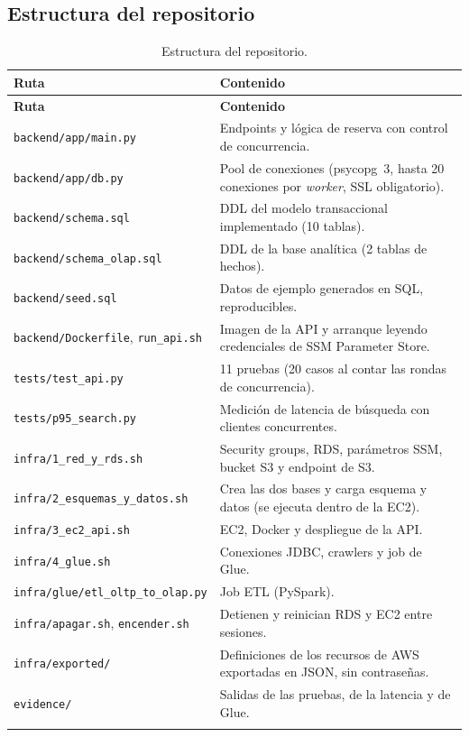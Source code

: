 \subsection{Estructura del repositorio}
\begin{longtable}{@{}L{5.0cm} L{10.6cm}@{}}
\toprule \textbf{Ruta} & \textbf{Contenido} \\ \midrule \endfirsthead
\toprule \textbf{Ruta} & \textbf{Contenido} \\ \midrule \endhead
\texttt{backend/app/main.py} & Endpoints y lógica de reserva con control de concurrencia. \\
\texttt{backend/app/db.py} & Pool de conexiones (psycopg~3, hasta 20 conexiones por \emph{worker}, SSL obligatorio). \\
\texttt{backend/schema.sql} & DDL del modelo transaccional implementado (10 tablas). \\
\texttt{backend/schema\_olap.sql} & DDL de la base analítica (2 tablas de hechos). \\
\texttt{backend/seed.sql} & Datos de ejemplo generados en SQL, reproducibles. \\
\texttt{backend/Dockerfile}, \texttt{run\_api.sh} & Imagen de la API y arranque leyendo credenciales de SSM Parameter Store. \\
\texttt{tests/test\_api.py} & 11 pruebas (20 casos al contar las rondas de concurrencia). \\
\texttt{tests/p95\_search.py} & Medición de latencia de búsqueda con clientes concurrentes. \\
\texttt{infra/1\_red\_y\_rds.sh} & Security groups, RDS, parámetros SSM, bucket S3 y endpoint de S3. \\
\texttt{infra/2\_esquemas\_y\_datos.sh} & Crea las dos bases y carga esquema y datos (se ejecuta dentro de la EC2). \\
\texttt{infra/3\_ec2\_api.sh} & EC2, Docker y despliegue de la API. \\
\texttt{infra/4\_glue.sh} & Conexiones JDBC, crawlers y job de Glue. \\
\texttt{infra/glue/etl\_oltp\_to\_olap.py} & Job ETL (PySpark). \\
\texttt{infra/apagar.sh}, \texttt{encender.sh} & Detienen y reinician RDS y EC2 entre sesiones. \\
\texttt{infra/exported/} & Definiciones de los recursos de AWS exportadas en JSON, sin contraseñas. \\
\texttt{evidence/} & Salidas de las pruebas, de la latencia y de Glue. \\
\bottomrule
\caption{Estructura del repositorio.}
\end{longtable}

